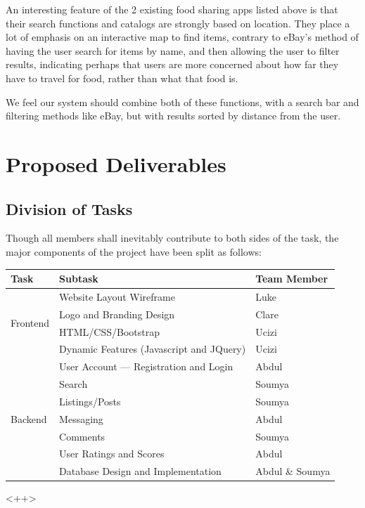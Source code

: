 \documentclass[12pt]{article}
\begin{document}
An interesting feature of the 2 existing food sharing apps listed above is that their search functions and catalogs are strongly based on location. They place a lot of emphasis on an interactive map to find items, contrary to eBay’s method of having the user search for items by name, and then allowing the user to filter results, indicating perhaps that users are more concerned about how far they have to travel for food, rather than what that food is.

We feel our system should combine both of these functions, with a search bar and filtering methods like eBay, but with results sorted by distance from the user.

\pagebreak

\section{Proposed Deliverables}
\subsection{Division of Tasks}

Though all members shall inevitably contribute to both sides of the task,
the major components of the project have been split as follows:

\begin{table}
    \centering
    \begin{tabular}{|p|p|p|}
        \hline
        \textbf{Task }& \textbf{Subtask }& \textbf{Team Member}\\
        \hline
        \multirow{4}{3.5cm}{Frontend} & Website Layout Wireframe & Luke\\
        & Logo and Branding Design & Clare\\
        & HTML/CSS/Bootstrap & Ucizi\\
        & Dynamic Features (Javascript and JQuery) & Ucizi\\
        \multirow{7}{3.5cm}{Backend} &  User Account --- Registration and Login & Abdul\\
        & Search & Soumya\\
        & Listings/Posts & Soumya\\
        & Messaging & Abdul\\
        & Comments & Soumya\\
        & User Ratings and Scores & Abdul\\
        & Database Design and Implementation & Abdul \& Soumya\\
    \end{tabular}
    \label{tab:<+label+>}
\end{table}<++>
\end{document}
